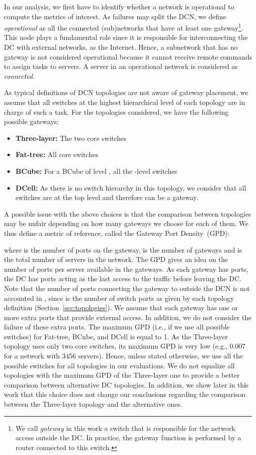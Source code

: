 In our analysis, we first have to identify whether a network is operational to compute the metrics of interest. As failures may split the DCN, we define \textit{operational} as all the connected (sub)networks that have at least one gateway\footnote{We call \textit{gateway} in this work a switch that is responsible for the network access outside the DC. In practice, the gateway function is performed by a router connected to this switch.}. This node plays a fundamental role since it is responsible for interconnecting the DC with external networks, as the Internet. Hence, a subnetwork that has no gateway is not considered operational because it cannot receive remote commands to assign tasks to servers. A server in an operational network is considered as \textit{connected}.

As typical definitions of DCN topologies are not aware of gateway placement, we assume that all switches at the highest hierarchical level of each topology are in charge of such a task. For the topologies considered, we have the following possible gateways:
\begin{itemize}
\item \textbf{Three-layer:} The two core switches
\item \textbf{Fat-tree:} All core switches
\item \textbf{BCube:} For a BCube of level , all the -level switches
\item \textbf{DCell:} As there is no switch hierarchy in this topology, we consider that all switches are at the top level and therefore can be a gateway.
\end{itemize}

A possible issue with the above choices is that the comparison between topologies may be unfair depending on how many gateways we choose for each of them. We thus define a metric of reference, called the Gateway Port Density~(GPD):

where  is the number of ports on the gateway,  is the number of gateways and  is the total number of servers in the network.
The GPD gives an idea on the number of ports per server available in the gateways. As each gateway has  ports, the DC has  ports acting as the last access to the traffic before leaving the DC. Note that the number of ports connecting the gateway to outside the DCN is not accounted in , since  is the number of switch ports as given by each topology definition (Section~\ref{sec:topologies}). We assume that each gateway has one or more extra ports that provide external access. In addition, we do not consider the failure of these extra ports.
The maximum GPD (i.e., if we use all possible switches) for Fat-tree, BCube, and DCell is equal to 1. 
As the Three-layer topology uses only two core switches, its maximum GPD is very low (e.g., 0.007 for a network with 3456 servers).
Hence, unless stated otherwise, we use all the possible switches for all topologies in our evaluations.
We do not equalize all topologies with the maximum GPD of the Three-layer one to provide a better comparison between alternative DC topologies.
In addition, we show later in this work that this choice does not change our conclusions regarding the comparison between the Three-layer topology and the alternative ones.

